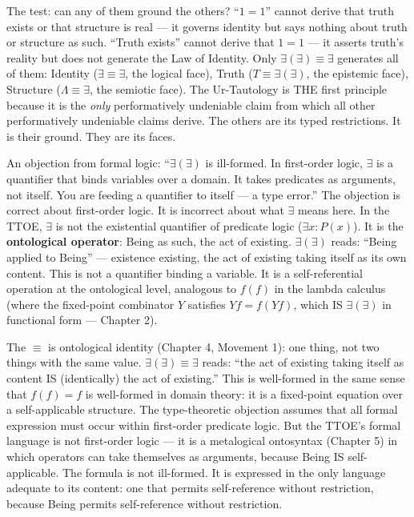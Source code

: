 \documentclass[10pt, openany, oneside]{book}
\begin{document}
The test: can any of them ground the others? ``$1 = 1$'' cannot derive that truth exists or that structure is real --- it governs identity but says nothing about truth or structure as such. ``Truth exists'' cannot derive that $1 = 1$ --- it asserts truth's reality but does not generate the Law of Identity. Only $\exists(\exists) \equiv \exists$ generates all of them: Identity ($\exists \equiv \exists$, the logical face), Truth ($T \equiv \exists(\exists)$, the epistemic face), Structure ($\Lambda \equiv \exists$, the semiotic face). The Ur-Tautology is THE first principle because it is the \textit{only} performatively undeniable claim from which all other performatively undeniable claims derive. The others are its typed restrictions. It is their ground. They are its faces.

An objection from formal logic: ``$\exists(\exists)$ is ill-formed. In first-order logic, $\exists$ is a quantifier that binds variables over a domain. It takes predicates as arguments, not itself. You are feeding a quantifier to itself --- a type error.'' The objection is correct about first-order logic. It is incorrect about what $\exists$ means here. In the TTOE, $\exists$ is not the existential quantifier of predicate logic ($\exists x: P(x)$). It is the \textbf{ontological operator}: Being as such, the act of existing. $\exists(\exists)$ reads: ``Being applied to Being'' --- existence existing, the act of existing taking itself as its own content. This is not a quantifier binding a variable. It is a self-referential operation at the ontological level, analogous to $f(f)$ in the lambda calculus (where the fixed-point combinator $Y$ satisfies $Yf = f(Yf)$, which IS $\exists(\exists)$ in functional form --- Chapter 2).

The $\equiv$ is ontological identity (Chapter 4, Movement 1): one thing, not two things with the same value. $\exists(\exists) \equiv \exists$ reads: ``the act of existing taking itself as content IS (identically) the act of existing.'' This is well-formed in the same sense that $f(f) = f$ is well-formed in domain theory: it is a fixed-point equation over a self-applicable structure. The type-theoretic objection assumes that all formal expression must occur within first-order predicate logic. But the TTOE's formal language is not first-order logic --- it is a metalogical ontosyntax (Chapter 5) in which operators can take themselves as arguments, because Being IS self-applicable. The formula is not ill-formed. It is expressed in the only language adequate to its content: one that permits self-reference without restriction, because Being permits self-reference without restriction.
\end{document}

